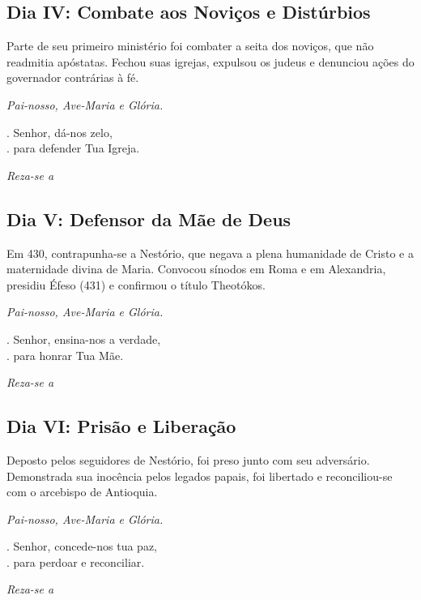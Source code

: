 \documentclass[18pt]{article}
\makeatletter
\newcommand{\vers@resp@sym}{%
  \raisebox{0.2ex}{\rotatebox[origin=c]{-20}{$\m@th\rceil$}}%
}
\newcommand{\vers@resp}[2]{%
  {\ooalign{%
     \hidewidth\kern#1\vers@resp@sym\hidewidth\cr
     #2\cr
  }}%
}
\DeclareRobustCommand{\versicle}{\vers@resp{-0.1em}{V}}
\DeclareRobustCommand{\response}{\vers@resp{0pt}{R}}
\makeatother
\begin{document}
\subsection*{Dia IV: Combate aos Noviços e Distúrbios}
\begin{justify}
Parte de seu primeiro ministério foi combater a seita dos noviços, que não readmitia apóstatas. Fechou suas igrejas, expulsou os judeus e denunciou ações do governador contrárias à fé.

\vspace{0.3cm}
\textit{Pai-nosso, Ave-Maria e Glória.}

\noindent
\versicle. Senhor, dá-nos zelo,\\
\response. para defender Tua Igreja.

\textit{Reza-se a }
\end{justify}

\subsection*{Dia V: Defensor da Mãe de Deus}
\begin{justify}
Em 430, contrapunha-se a Nestório, que negava a plena humanidade de Cristo e a maternidade divina de Maria. Convocou sínodos em Roma e em Alexandria, presidiu Éfeso (431) e confirmou o título Theotókos.

\vspace{0.3cm}
\textit{Pai-nosso, Ave-Maria e Glória.}

\noindent
\versicle. Senhor, ensina-nos a verdade,\\
\response. para honrar Tua Mãe.

\textit{Reza-se a }
\end{justify}

\subsection*{Dia VI: Prisão e Liberação}
\begin{justify}
Deposto pelos seguidores de Nestório, foi preso junto com seu adversário. Demonstrada sua inocência pelos legados papais, foi libertado e reconciliou-se com o arcebispo de Antioquia.

\vspace{0.3cm}
\textit{Pai-nosso, Ave-Maria e Glória.}

\noindent
\versicle. Senhor, concede-nos tua paz,\\
\response. para perdoar e reconciliar.

\textit{Reza-se a }
\end{justify}
\end{document}
